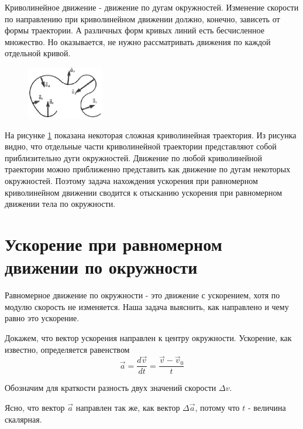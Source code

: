 \documentclass[a5paper, 10pt]{diss_4}
\renewcommand{\'}{\,'}
\begin{document}
  Криволинейное движение - движение по дугам окружностей. Изменение
скорости по направлению при криволинейном движении должно, конечно, зависеть от
формы траектории. А различных форм кривых линий есть бесчисленное множество. Но
оказывается, не нужно рассматривать движения по каждой отдельной кривой.

\begin{figure}
\includegraphics[width=0.3\textwidth]{img/img_20.eps}
\caption{}
\label{r62}
\end{figure}

  На рисунке \ref{r62} показана некоторая сложная криволинейная траектория. Из
рисунка видно, что отдельные части криволинейной траектории представляют собой
приблизительно дуги окружностей. Движение по любой криволинейной траектории
можно приближенно представить как движение по дугам некоторых окружностей.
Поэтому задача нахождения ускорения при равномерном криволинейном движении
сводится к отысканию ускорения при равномерном движении тела по окружности.

\section{Ускорение при  равномерном движении   по окружности}

  Равномерное движение по окружности - это движение с ускорением, хотя по
модулю скорость не изменяется. Наша задача выяснить, как направлено и чему
равно это ускорение.

  Докажем, что вектор ускорения направлен к центру окружности. Ускорение,
как известно, определяется равенством
\[
\vec{a}=\frac{d\vec{v}}{dt}=\frac{\vec{v}-\vec{v}_0}{t}
\]

Обозначим для краткости разность двух значений скорости $\Delta v$.

  Ясно, что вектор $\vec{a}$ направлен так же, как вектор $\Delta\vec{a}$,
потому что $t$ - величина скалярная.
\end{document}

